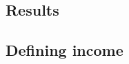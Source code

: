 \documentclass[twoside]{article}\usepackage[]{graphicx}\usepackage[]{color}
\begin{document}
\begin{multicols}{2}









\section{Results}



\subsection{Defining income}



\end{multicols}
\end{document}

